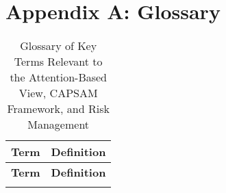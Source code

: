 \section*{Appendix A: Glossary}

\renewcommand{\arraystretch}{1.3}
\begin{longtable}{|m{4cm}|m{10cm}|}
    \caption{Glossary of Key Terms Relevant to the Attention-Based View, CAPSAM Framework, and Risk Management}
    \label{tab:Glossary} \\
    \hline
    \textbf{Term} & \textbf{Definition} \\ \hline\hline
    \endfirsthead
    \hline
    \textbf{Term} & \textbf{Definition} \\ \hline
    \endhead
    \hline
    \endfoot
    \hline
    \endlastfoot


\end{longtable}
